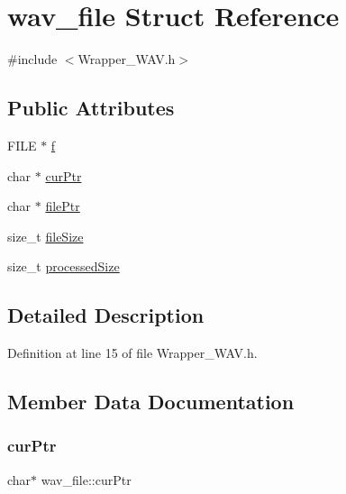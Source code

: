 \hypertarget{structwav__file}{}\section{wav\+\_\+file Struct Reference}
\label{structwav__file}


{\ttfamily \#include $<$Wrapper\+\_\+\+W\+A\+V.\+h$>$}

\subsection*{Public Attributes}
\begin{DoxyCompactItemize}
\item 
F\+I\+LE $\ast$ \mbox{\hyperlink{structwav__file_a6c9f1ab95d2d33cd281db66512fa8132}{f}}
\item 
char $\ast$ \mbox{\hyperlink{structwav__file_a9c297f2327634372cd6018b327908fca}{cur\+Ptr}}
\item 
char $\ast$ \mbox{\hyperlink{structwav__file_a1d05305462c7031096e5a57cba20a329}{file\+Ptr}}
\item 
size\+\_\+t \mbox{\hyperlink{structwav__file_a8607accef1ceb2d143e91e4468e1ca47}{file\+Size}}
\item 
size\+\_\+t \mbox{\hyperlink{structwav__file_ac0b004bf1255fa2ea5d4a41316a4253d}{processed\+Size}}
\end{DoxyCompactItemize}


\subsection{Detailed Description}


Definition at line 15 of file Wrapper\+\_\+\+W\+A\+V.\+h.



\subsection{Member Data Documentation}
\mbox{\label{structwav__file_a9c297f2327634372cd6018b327908fca}} 
\subsubsection{\texorpdfstring{cur\+Ptr}{curPtr}}
{\footnotesize\ttfamily char$\ast$ wav\+\_\+file\+::cur\+Ptr}



